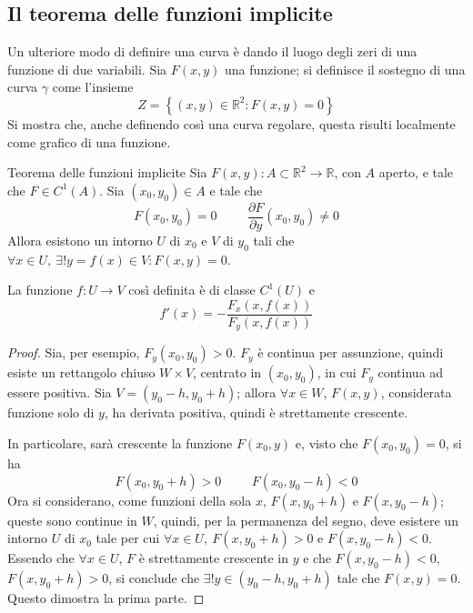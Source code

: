 \documentclass[11pt, a4paper]{scrartcl}
\theoremstyle{definition}
\numberwithin{esempio}{section}
\theoremstyle{definition}
\numberwithin{obs}{section}
\numberwithin{nota}{section}
\numberwithin{equation}{subsection}
\begin{document}
\subsection{Il teorema delle funzioni implicite}
Un ulteriore modo di definire una curva \`e dando il luogo degli zeri di una funzione di due variabili. 
Sia $F(x,y)$ una funzione; si  definisce il sostegno di una curva $\gamma$ come l'insieme
\[
Z = \left\{ (x,y) \in \mathbb{R}^2 : F(x,y) = 0 \right\} 
\] 
Si mostra che, anche definendo cos\`i una curva regolare, questa risulti localmente come grafico di una funzione.
\begin{teorema}
	{Teorema delle funzioni implicite}{}
	Sia $F(x,y):A \subset \mathbb{R}^2 \to \mathbb{R}$, con $A$ aperto, e tale che $F \in C^1(A)$.
	Sia $(x_0,y_0) \in A $ e tale che
	\[
		F(x_0,y_0) = 0 \hspace{1cm} \frac{\partial F}{\partial y} (x_0,y_0) \neq 0
	\] 
Allora esistono un intorno $U$ di $x_0$ e $V$ di $y_0$  tali che $\forall x \in U, \ \exists ! y = f(x) \in V : F(x,y)=0$.

La funzione $f:U \to V$ cos\`i definita \`e di classe $C^1(U)$ e 
\[
f'(x) = - \frac{F_x(x,f(x))}{F_y(x,f(x))}
\] 
\begin{proof}
	Sia, per esempio, $F_{y} (x_0,y_0)>0$. 
	$F_y$ \`e continua per assunzione, quindi esiste un rettangolo chiuso $W \times V$, centrato in $(x_0,y_0)$, in cui $F_y$ continua ad essere positiva.
	Sia $V=(y_0-h,y_0+h)$; allora  $\forall x \in W$, $F(x,y)$, considerata funzione solo di $y$, ha derivata positiva, quindi \`e strettamente crescente.

	In particolare, sar\`a crescente la funzione $F(x_0,y)$ e, visto che $F(x_0,y_0) = 0$, si ha
	\[
		F(x_0,y_0+h) > 0 \hspace{1cm} F(x_0,y_0 - h) < 0
	\] 
Ora si considerano, come funzioni della sola $x$, $F(x,y_0+h)$ e $F(x,y_0-h)$; queste sono continue in $W$, quindi, per la permanenza del segno, deve esistere un intorno $U$ di $x_0$ tale per cui $\forall x \in U, \ F(x,y_0+h) >0 $ e $F(x,y_0-h)<0$.
Essendo che $\forall x \in U$, $F$ \`e strettamente crescente in $y$ e che $F(x,y_0-h) < 0$, $F(x,y_0+h)>0$, si conclude che $\exists ! y \in (y_0-h,y_0+h)$ tale che $F(x,y) = 0$.
Questo dimostra la prima parte.


\end{proof}
\end{teorema}
\end{document}
